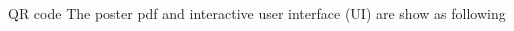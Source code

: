 \documentclass[final,t]{beamer}
\begin{document}
\begin{frame}[fragile]
\begin{columns}[t]
\begin{column}{0.38\linewidth}
\begin{columns}[onlytextwidth, t]
    \begin{block}{QR code}
    The poster pdf and interactive user interface (UI) are show as following 
        \begin{figure}[h]
 \centering
  \qquad
\end{figure}
    \end{block}
\end{columns}
% 
    \end{column}%
  \end{columns}

\end{frame}
\end{document}
